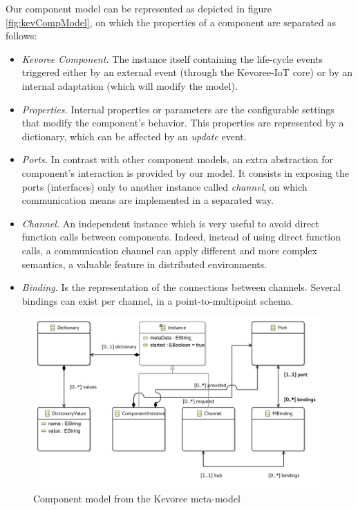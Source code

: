 Our component model can be represented as depicted in figure \ref{fig:kevCompModel}, on which the properties of a component are separated as follows:
\begin{itemize}
	\item \textit{Kevoree Component.} The instance itself containing the life-cycle events triggered either by an external event (through the Kevoree-IoT core) or by an internal adaptation (which will modify the model).
	\item \textit{Properties.} Internal properties or parameters are the configurable settings that modify the component's behavior.
	This properties are represented by a dictionary, which can be affected by an \textit{update} event.
	\item \textit{Ports.} In contrast with other component models, an extra abstraction for component's interaction is provided by our model.
	It consists in exposing the ports (interfaces) only to another instance called \textit{channel}, on which communication means are implemented in a separated way.
	\item \textit{Channel.} An independent instance which is very useful to avoid direct function calls between components.
	Indeed, instead of using direct function calls, a communication channel can apply different and more complex semantics, a valuable feature in distributed environments\cite{fouquet2013kevoree, barais2005construire}.
	\item \textit{Binding.} Is the representation of the connections between channels. Several bindings can exist per channel, in a point-to-multipoint schema.
\end{itemize}

\begin{figure}[htb]
	\centering
	\includegraphics[width=0.95\columnwidth]{chapters/calpulli.images/ComponentModelUML.pdf}
	\caption{Component model from the Kevoree meta-model} \label{fig:kevCompModelUML}
\end{figure}


